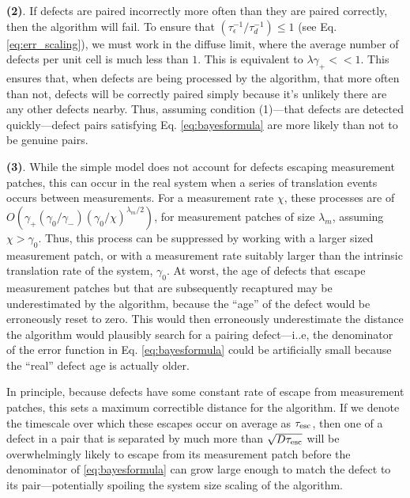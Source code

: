 \documentclass[twocolumn,superscriptaddress,aps,prb,floatfix]{revtex4-1}
\newcommand{\te}{\tau_{\rm{esc}}}
\begin{document}
 \textbf{(2)}. If defects are paired incorrectly more often than they are paired correctly, then the algorithm will fail.  To ensure that $(\tau_{\epsilon}^{-1} / \tau_d^{-1})\leq1$ (see Eq. \ref{eq:err_scaling}), we must work in the diffuse limit, where the average number of defects per unit cell is much less than $1$.  This is equivalent to $\lambda \gamma_+<<1$.  This ensures that, when defects are being processed by the algorithm, that more often than not, defects will be correctly paired simply because it's unlikely there are any other defects nearby.  Thus, assuming condition (1)---that defects are detected quickly---defect pairs satisfying Eq. \ref{eq:bayesformula} are more likely than not to be genuine pairs. 
 
 \textbf{(3)}. While the simple model does not account for defects escaping measurement patches, this can occur in the real system when a series of translation events occurs between measurements.  For a measurement rate $\chi$, these processes are of $O(\gamma_+ (\gamma_0/\gamma_-) (\gamma_0/\chi)^{\lambda_m/2})$, for measurement patches of size $\lambda_m$, assuming $\chi > \gamma_0$.  Thus, this process can be suppressed by working with a larger sized measurement patch, or with a measurement rate suitably larger than the intrinsic translation rate of the system, $\gamma_0$.  At worst, the age of defects that escape measurement patches but that are subsequently recaptured may be underestimated by the algorithm, because the ``age'' of the defect would be erroneously reset to zero.  This would then erroneously underestimate the distance the algorithm would plausibly search for a pairing defect---i..e, the denominator of the error function in Eq. \ref{eq:bayesformula} could be artificially small because the ``real'' defect age is actually older.

 In principle, because defects have some constant rate of escape from measurement patches, this sets a maximum correctible distance for the algorithm.  If we denote the timescale over which these escapes occur on average as $\te$, then one of a defect in a pair that is separated by much more than $\sqrt{D \te}$ will be overwhelmingly likely to escape from its measurement patch before the denominator of \ref{eq:bayesformula} can grow large enough to match the defect to its pair---potentially spoiling the system size scaling of the algorithm.
 
\end{document}
